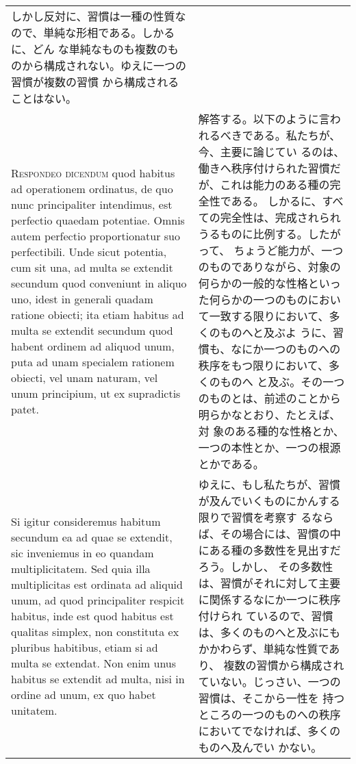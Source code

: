 \documentclass[10pt]{jsarticle} %
\begin{document}
\begin{longtable}{p{21em}p{21em}}
しかし反対に、習慣は一種の性質なので、単純な形相である。しかるに、どん
な単純なものも複数のものから構成されない。ゆえに一つの習慣が複数の習慣
から構成されることはない。

\\



{\scshape Respondeo dicendum} quod habitus ad operationem ordinatus,
de quo nunc principaliter intendimus, est perfectio quaedam
potentiae. Omnis autem perfectio proportionatur suo perfectibili. Unde
sicut potentia, cum sit una, ad multa se extendit secundum quod
conveniunt in aliquo uno, idest in generali quadam ratione obiecti;
ita etiam habitus ad multa se extendit secundum quod habent ordinem ad
aliquod unum, puta ad unam specialem rationem obiecti, vel unam
naturam, vel unum principium, ut ex supradictis patet.


&

解答する。以下のように言われるべきである。私たちが、今、主要に論じてい
るのは、働きへ秩序付けられた習慣だが、これは能力のある種の完全性である。
しかるに、すべての完全性は、完成されられうるものに比例する。したがって、
ちょうど能力が、一つのものでありながら、対象の何らかの一般的な性格といっ
た何らかの一つのものにおいて一致する限りにおいて、多くのものへと及ぶよ
うに、習慣も、なにか一つのものへの秩序をもつ限りにおいて、多くのものへ
と及ぶ。その一つのものとは、前述のことから明らかなとおり、たとえば、対
象のある種的な性格とか、一つの本性とか、一つの根源とかである。

\\


Si igitur consideremus habitum secundum ea ad quae se extendit, sic
inveniemus in eo quandam multiplicitatem. Sed quia illa multiplicitas
est ordinata ad aliquid unum, ad quod principaliter respicit habitus,
inde est quod habitus est qualitas simplex, non constituta ex pluribus
habitibus, etiam si ad multa se extendat. Non enim unus habitus se
extendit ad multa, nisi in ordine ad unum, ex quo habet unitatem.

&

ゆえに、もし私たちが、習慣が及んでいくものにかんする限りで習慣を考察す
るならば、その場合には、習慣の中にある種の多数性を見出すだろう。しかし、
その多数性は、習慣がそれに対して主要に関係するなにか一つに秩序付けられ
ているので、習慣は、多くのものへと及ぶにもかかわらず、単純な性質であり、
複数の習慣から構成されていない。じっさい、一つの習慣は、そこから一性を
持つところの一つのものへの秩序においてでなければ、多くのものへ及んでい
かない。


\end{longtable}
\end{document}
